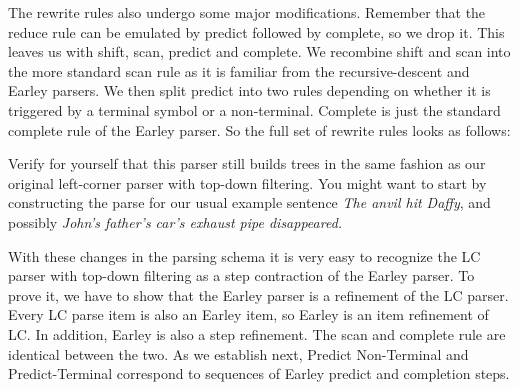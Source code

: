 The rewrite rules also undergo some major modifications.
Remember that the reduce rule can be emulated by predict followed by complete, so we drop it.
This leaves us with shift, scan, predict and complete.
We recombine shift and scan into the more standard scan rule as it is familiar from the recursive-descent and Earley parsers.
We then split predict into two rules depending on whether it is triggered by a terminal symbol or a non-terminal.
Complete is just the standard complete rule of the Earley parser.
So the full set of rewrite rules looks as follows:
%
\begin{prooftree}
\end{prooftree}
%
\begin{prooftree}
\end{prooftree}
%
\begin{prooftree}
\end{prooftree}
%
\begin{prooftree}
\end{prooftree}
%
\begin{exercise}
    Verify for yourself that this parser still builds trees in the same fashion as our original left-corner parser with top-down filtering.
    You might want to start by constructing the parse for our usual example sentence \emph{The anvil hit Daffy}, and possibly \emph{John's father's car's exhaust pipe disappeared.}
\end{exercise}

With these changes in the parsing schema it is very easy to recognize the LC parser with top-down filtering as a step contraction of the Earley parser.
To prove it, we have to show that the Earley parser is a refinement of the LC parser.
Every LC parse item is also an Earley item, so Earley is an item refinement of LC\@.
In addition, Earley is also a step refinement.
The scan and complete rule are identical between the two.
As we establish next, Predict Non-Terminal and Predict-Terminal correspond to sequences of Earley predict and completion steps. 

